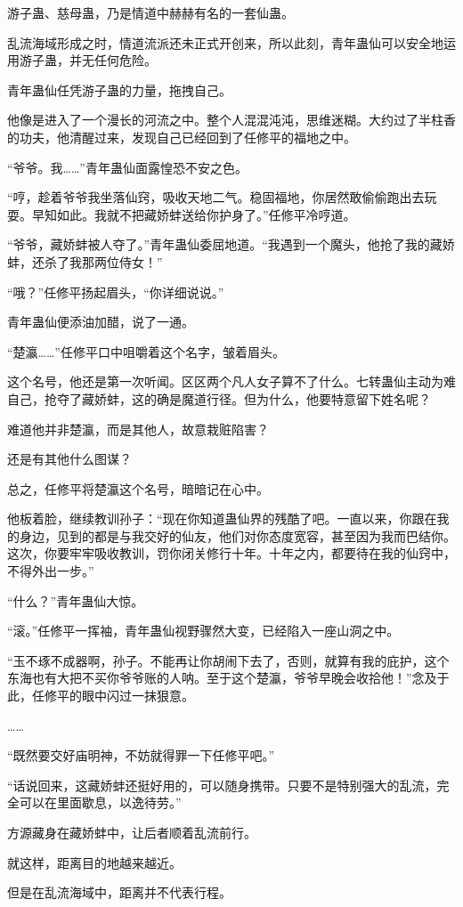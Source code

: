 \begin{this_body}
游子蛊、慈母蛊，乃是情道中赫赫有名的一套仙蛊。

乱流海域形成之时，情道流派还未正式开创来，所以此刻，青年蛊仙可以安全地运用游子蛊，并无任何危险。

青年蛊仙任凭游子蛊的力量，拖拽自己。

他像是进入了一个漫长的河流之中。整个人混混沌沌，思维迷糊。大约过了半柱香的功夫，他清醒过来，发现自己已经回到了任修平的福地之中。

“爷爷。我……”青年蛊仙面露惶恐不安之色。

“哼，趁着爷爷我坐落仙窍，吸收天地二气。稳固福地，你居然敢偷偷跑出去玩耍。早知如此。我就不把藏娇蚌送给你护身了。”任修平冷哼道。

“爷爷，藏娇蚌被人夺了。”青年蛊仙委屈地道。“我遇到一个魔头，他抢了我的藏娇蚌，还杀了我那两位侍女！”

“哦？”任修平扬起眉头，“你详细说说。”

青年蛊仙便添油加醋，说了一通。

“楚瀛……”任修平口中咀嚼着这个名字，皱着眉头。

这个名号，他还是第一次听闻。区区两个凡人女子算不了什么。七转蛊仙主动为难自己，抢夺了藏娇蚌，这的确是魔道行径。但为什么，他要特意留下姓名呢？

难道他并非楚瀛，而是其他人，故意栽赃陷害？

还是有其他什么图谋？

总之，任修平将楚瀛这个名号，暗暗记在心中。

他板着脸，继续教训孙子：“现在你知道蛊仙界的残酷了吧。一直以来，你跟在我的身边，见到的都是与我交好的仙友，他们对你态度宽容，甚至因为我而巴结你。这次，你要牢牢吸收教训，罚你闭关修行十年。十年之内，都要待在我的仙窍中，不得外出一步。”

“什么？”青年蛊仙大惊。

“滚。”任修平一挥袖，青年蛊仙视野骤然大变，已经陷入一座山洞之中。

“玉不琢不成器啊，孙子。不能再让你胡闹下去了，否则，就算有我的庇护，这个东海也有大把不买你爷爷账的人呐。至于这个楚瀛，爷爷早晚会收拾他！”念及于此，任修平的眼中闪过一抹狠意。

……

“既然要交好庙明神，不妨就得罪一下任修平吧。”

“话说回来，这藏娇蚌还挺好用的，可以随身携带。只要不是特别强大的乱流，完全可以在里面歇息，以逸待劳。”

方源藏身在藏娇蚌中，让后者顺着乱流前行。

就这样，距离目的地越来越近。

但是在乱流海域中，距离并不代表行程。


\end{this_body}
